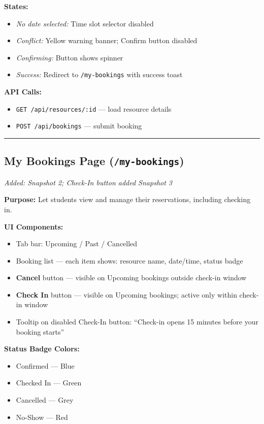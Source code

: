 \documentclass[12pt]{article}
\begin{document}
\textbf{States:}
\begin{itemize}
    \item \textit{No date selected:} Time slot selector disabled
    \item \textit{Conflict:} Yellow warning banner; Confirm button disabled
    \item \textit{Confirming:} Button shows spinner
    \item \textit{Success:} Redirect to \texttt{/my-bookings} with success toast
\end{itemize}

\textbf{API Calls:}
\begin{itemize}
    \item \texttt{GET /api/resources/:id} --- load resource details
    \item \texttt{POST /api/bookings} --- submit booking
\end{itemize}

\hrule\vspace{1em}

\subsection{My Bookings Page (\texttt{/my-bookings})}
\textit{Added: Snapshot 2; Check-In button added Snapshot 3}

\textbf{Purpose:} Let students view and manage their reservations, including checking in.

\textbf{UI Components:}
\begin{itemize}
    \item Tab bar: Upcoming / Past / Cancelled
    \item Booking list --- each item shows: resource name, date/time, status badge
    \item \textbf{Cancel} button --- visible on Upcoming bookings outside check-in window
    \item \textbf{Check In} button --- visible on Upcoming bookings; active only within check-in window
    \item Tooltip on disabled Check-In button: ``Check-in opens 15 minutes before your booking starts''
\end{itemize}

\textbf{Status Badge Colors:}
\begin{itemize}
    \item Confirmed --- Blue
    \item Checked In --- Green
    \item Cancelled --- Grey
    \item No-Show --- Red
\end{itemize}
\end{document}
